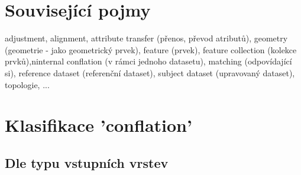 \section{Související pojmy} %
\label{pojmy}

adjustment, alignment, attribute transfer (přenos, převod atributů), geometry
(geometrie - jako geometrický prvek), feature (prvek), feature collection 
(kolekce prvků),ninternal conflation (v rámci jednoho datasetu), matching 
(odpovídající si), reference dataset (referenční dataset), subject dataset 
(upravovaný dataset), topologie, ... 


\section{Klasifikace 'conflation'}
\label{klasifikace}

\subsection{Dle typu vstupních vrstev}
\label{dle-vstupu}

